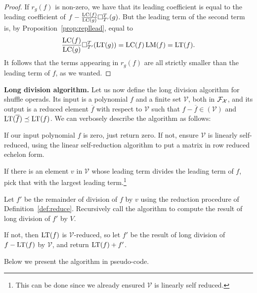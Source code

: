 \begin{proof}
If $r_g(f)$ is non-zero, we have that its leading coefficient is 
equal to the leading coefficient of $f- \frac{\operatorname{LC}(f)}{\operatorname{LC}(g)}\square_{T'}^{T}(g)$. But the leading term of the second term is, by
Proposition~\ref{prop:repllead}, equal to 
\[ \frac{\operatorname{LC}(f)}{\operatorname{LC}(g)}\square_{T'}^{T}(\operatorname{LT}(g)) =  \operatorname{LC}(f) \operatorname{LM}(f) 
	= \operatorname{LT}(f).\]
It follows that the terms appearing in $r_g(f)$ are all strictly smaller
than the leading term of $f$, as we wanted. 
\end{proof}

\textbf{Long division algorithm.}
Let us now define the long division algorithm for shuffle operads.
Its input is a polynomial $f$ and a finite set $\mathcal V$, both
in $\mathcal{F}_{\mathcal{X}}$, and its
output is a reduced element $\overline{f}$ with respect to $\mathcal
V$ such that $f-\overline{f} \in (\mathcal V)$ and $\operatorname{LT}(\overline{f})
\preceq \operatorname{LT}(f)$. We can verbosely describe the algorithm as follows: 
\begin{tenumerate}
\item If our input polynomial
$f$ is zero, just return zero. If not, ensure $\mathcal V$
is linearly self-reduced, using the linear self-reduction algorithm to put a matrix
in row reduced echelon form.
\item If there is an element $v$ in $\mathcal V$ 
whose leading term divides the
leading term of $f$, pick that with the largest leading term.\footnote{This
 can be done since we already ensured $\mathcal V$ is linearly
self reduced.}
\item Let $f'$ be the remainder of division of $f$
by $v$ using the reduction procedure of Definition~\ref{def:reduce}.
Recursively call the algorithm to compute the result of long
division of $f'$ by $V$.
\item If not, then $\operatorname{LT}(f)$ is $\mathcal V$-reduced, 
so let $f'$ be the result of long division of $f-\operatorname{LT}(f)$ by $\mathcal V$, and return $\operatorname{LT}(f) + f'$.
\end{tenumerate}
Below we present the algorithm in pseudo-code.
